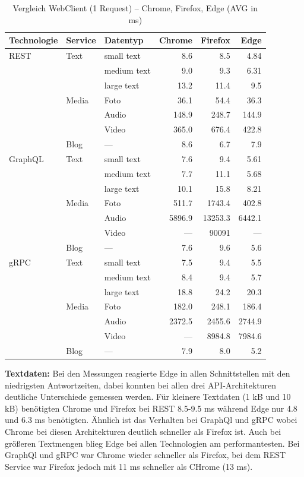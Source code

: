 	\begin{table}[h]
		\centering
		\caption{Vergleich WebClient (1 Request) – Chrome, Firefox, Edge (AVG in ms)}
		\label{tab:browser-comparison-1req}
		\renewcommand{\arraystretch}{1.2}
		\begin{tabular}{|l|l|l|r|r|r|}
			\hline
			\textbf{Technologie} & \textbf{Service} & \textbf{Datentyp} & \textbf{Chrome} & \textbf{Firefox} & \textbf{Edge} \\
			\hline
			REST & Text  & small text  & 8.6   & 8.5   & 4.84 \\
			&       & medium text & 9.0   & 9.3   & 6.31 \\
			&       & large text  & 13.2  & 11.4  & 9.5  \\
			& Media & Foto        & 36.1  & 54.4  & 36.3 \\
			&       & Audio       & 148.9 & 248.7 & 144.9 \\
			&       & Video       & 365.0 & 676.4 & 422.8 \\
			& Blog  & —           & 8.6   & 6.7   & 7.9  \\
			\hline
			GraphQL & Text  & small text  & 7.6   & 9.4   & 5.61 \\
			&       & medium text & 7.7   & 11.1  & 5.68 \\
			&       & large text  & 10.1  & 15.8  & 8.21 \\
			& Media & Foto        & 511.7 & 1743.4 & 402.8 \\
			&       & Audio       & 5896.9 & 13253.3 & 6442.1 \\
			&       & Video       & —     & 90091  & — \\
			& Blog  & —           & 7.6   & 9.6   & 5.6 \\
			\hline
			gRPC & Text  & small text  & 7.5   & 9.4   & 5.5 \\
			&       & medium text & 8.4   & 9.4   & 5.7 \\
			&       & large text  & 18.8  & 24.2  & 20.3 \\
			& Media & Foto        & 182.0 & 248.1 & 186.4 \\
			&       & Audio       & 2372.5 & 2455.6 & 2744.9 \\
			&       & Video       & —     & 8984.8 & 7984.6 \\
			& Blog  & —           & 7.9   & 8.0   & 5.2 \\
			\hline
		\end{tabular}
	\end{table}

\clearpage
\textbf{Textdaten:}  
Bei den Messungen reagierte Edge in allen Schnittstellen mit den niedrigsten Antwortzeiten, dabei konnten bei allen drei API-Architekturen deutliche Unterschiede gemessen werden. Für kleinere Textdaten (1 kB und 10 kB) benötigten Chrome und Firefox bei REST 8.5-9.5 ms während Edge nur 4.8 und 6.3 ms benötigten. Ähnlich ist das Verhalten bei GraphQl und gRPC wobei Chrome bei diesen Architekturen deutlich schneller als Firefox ist. Auch bei größeren Textmengen blieg Edge bei allen Technologien am performantesten. Bei GraphQl und gRPC war Chrome wieder schneller als Firefox, bei dem REST Service war Firefox jedoch mit 11 ms schneller als CHrome (13 ms).


